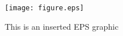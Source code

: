 \documentclass{article}
\begin{document}
\begin{figure}
\centering
\texttt{[image: figure.eps]}
\caption{This is an inserted EPS graphic}
\label{fig1}
\end{figure}
\end{document}
